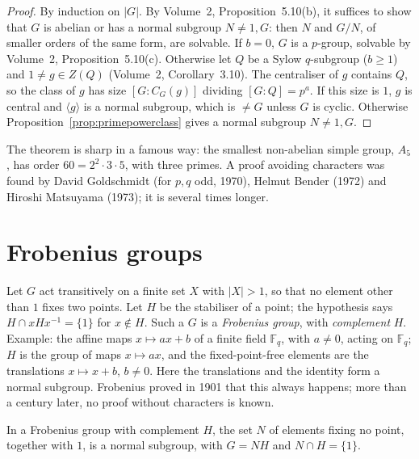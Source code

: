 \begin{proof}
By induction on $|G|$. By Volume~2, Proposition~5.10(b), it suffices to show that $G$ is abelian or has a normal subgroup $N\ne1,G$: then $N$ and $G/N$, of smaller orders of the same form, are solvable. If $b=0$, $G$ is a
$p$-group, solvable by Volume~2, Proposition~5.10(c). Otherwise let $Q$ be a Sylow $q$-subgroup ($b\ge1$) and $1\ne g\in Z(Q)$ (Volume~2, Corollary~3.10). The centraliser of $g$ contains $Q$, so the class of $g$ has size
$[G:C_G(g)]$ dividing $[G:Q]=p^a$. If this size is $1$, $g$ is central and $\langle g\rangle$ is a normal subgroup, which is $\ne G$ unless $G$ is cyclic. Otherwise Proposition~\ref{prop:primepowerclass} gives a normal subgroup
$N\ne1,G$.
\end{proof}

The theorem is sharp in a famous way: the smallest non-abelian simple group, $A_5$, has order $60=2^2\cdot3\cdot5$, with three primes. A proof avoiding characters was found by David Goldschmidt (for $p,q$ odd, 1970), Helmut Bender (1972) and
Hiroshi Matsuyama (1973); it is several times longer.

\section{Frobenius groups}

Let $G$ act transitively on a finite set $X$ with $|X|>1$, so that no element other than $1$ fixes two points. Let $H$ be the stabiliser of a point; the hypothesis says $H\cap xHx^{-1}=\{1\}$ for $x\notin H$. Such a $G$ is a
\emph{Frobenius group}, with \emph{complement} $H$. Example: the affine maps $x\mapsto ax+b$ of a finite field $\mathbb F_q$, with $a\ne0$, acting on $\mathbb F_q$; $H$ is the group of maps $x\mapsto ax$, and the fixed-point-free elements are the
translations $x\mapsto x+b$, $b\ne0$. Here the translations and the identity form a normal subgroup. Frobenius proved in 1901 that this always happens; more than a century later, no proof without characters is known.

\begin{theorem}[Frobenius, 1901]\label{thm:frobeniuskernel}
In a Frobenius group with complement $H$, the set $N$ of elements fixing no point, together with $1$, is a normal subgroup, with $G=NH$ and $N\cap H=\{1\}$.
\end{theorem}

